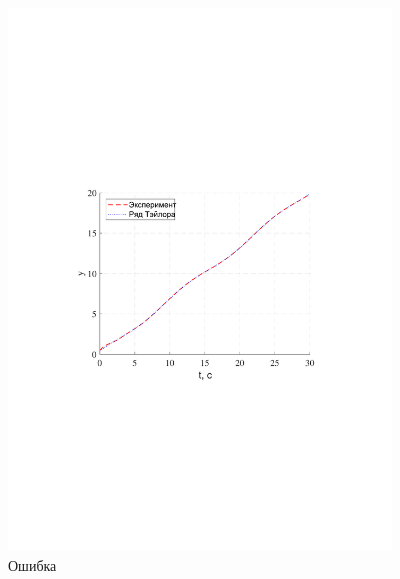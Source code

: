 \documentclass[a4paper,12pt]{article}
\begin{document}
	\begin{figure}[h]
		\renewcommand{\figurename}{Рисунок}
		\centering
		\includegraphics[width=4in]{TailorGrafikMOD.pdf}
		\caption{Ошибка}
		\label{s_21}
	\end{figure}
	
\end{document}
